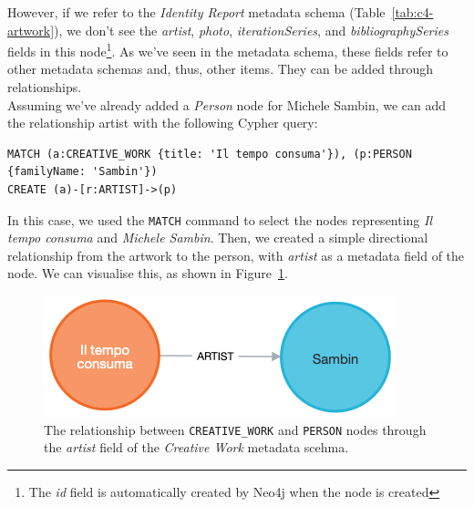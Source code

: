 However, if we refer to the \textit{Identity Report} metadata schema (Table~\ref{tab:c4-artwork}), we don’t see the \textit{artist}, \textit{photo}, \textit{iterationSeries}, and \textit{bibliographySeries} fields in this node\footnote{The \textit{id} field is automatically created by Neo4j when the node is created}. As we’ve seen in the metadata schema, these fields refer to other metadata schemas and, thus, other items. They can be added through relationships.\\
Assuming we’ve already added a \textit{Person} node for Michele Sambin, we can add the relationship artist with the following Cypher query:
\begin{lstlisting}[style=cypher]
MATCH (a:CREATIVE_WORK {title: 'Il tempo consuma'}), (p:PERSON {familyName: 'Sambin'})
CREATE (a)-[r:ARTIST]->(p)
\end{lstlisting}
In this case, we used the \texttt{MATCH} command to select the nodes representing \textit{Il tempo consuma} and \textit{Michele Sambin}. Then, we created a simple directional relationship from the artwork to the person, with \textit{artist} as a metadata field of the  node. We can visualise this, as shown in Figure~\ref{fig:c4-neo4j-artworkrelation}.

\begin{figure}[!h]
    \centering
    \includegraphics[width=0.5\linewidth]{chapters/4-MDC_model_application/image/neo4j-singlerelationship.png}
    \caption{The relationship between \texttt{CREATIVE\_WORK} and \texttt{PERSON} nodes through the \textit{artist} field of the \textit{Creative Work} metadata scehma.}
    \label{fig:c4-neo4j-artworkrelation}
\end{figure}

